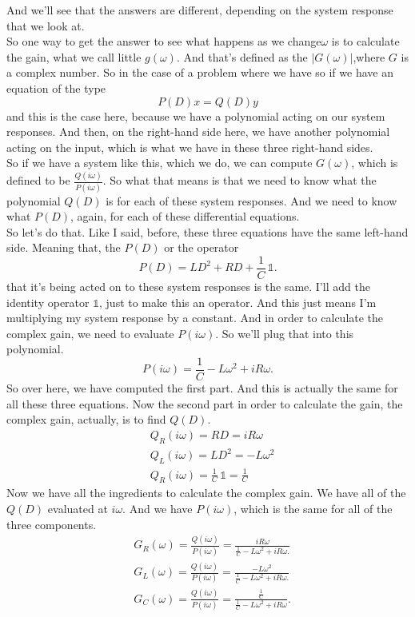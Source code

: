 And we'll see that the answers are different,
depending on the system response that we look at. \\


So one way to get the answer to see
what happens as we change$\omega$ is to calculate the gain, what we call little $g(\omega)$.
And that's defined as the $|G(\omega)|$,where $G$ is a complex number.
So in the case of a problem where we have
so if we have an equation of the type 
\begin{equation*}
  P(D)x = Q(D)y 
\end{equation*}
and this is the case here, because we have a polynomial acting on our system responses.
And then, on the right-hand side here, we have another polynomial acting on the input, which
is what we have in these three right-hand sides.\\
So if we have a system like this, which we do,
we can compute $G(\omega)$, which
is defined to be $\frac{Q(i \omega)}{P(i \omega)}$.
So what that means is that we need
to know what the polynomial $Q(D)$ is for each of these system responses.
And we need to know what $P(D)$, again, for each of these differential equations.\\


So let's do that.
Like I said, before, these three equations
have the same left-hand side.
Meaning that, the $P(D)$ or the operator
\begin{equation*}
  P(D) = LD^2 + RD + \frac{1}{C}\,  \mathds{1}. 
\end{equation*}
that it's being acted on to these system responses is the same.
I'll add the identity operator $\mathds{1}$, just to make this an operator.
And this just means I'm multiplying my system response by a constant.
And in order to calculate the complex gain,
we need to evaluate $P(i \omega)$.
So we'll plug that into this polynomial.
\begin{equation*}
  P(i \omega) = \frac{1}{C} - L \omega ^2 + iR \omega. 
\end{equation*}
So over here, we have computed the first part.
And this is actually the same for all these three equations.
Now the second part in order to calculate the gain,
the complex gain, actually, is to find $Q(D)$.
\begin{align*}
  &Q _R(i \omega) = RD = iR \omega \\
  &Q _L(i \omega) = LD^2 = -L \omega^2 \\
  &Q _R(i \omega) = \frac{1}{C}\, \mathds{1} = \frac{1}{C}
\end{align*}
Now we have all the ingredients to calculate the complex gain.
We have all of the $Q(D)$ evaluated at $i \omega$.
And we have $P(i \omega)$, which is the same for all
of the three components.
\begin{align*}
  &G _R(\omega) = \frac{Q(i \omega)}{P(i \omega)}
    = \frac{iR \omega}{\frac{1}{C} - L \omega ^2 + iR \omega. } \\
  &G _L(\omega) = \frac{Q(i \omega)}{P(i \omega)}
    = \frac{-L \omega ^2}{\frac{1}{C} - L \omega ^2 + iR \omega. } \\
  &G _C(\omega) = \frac{Q(i \omega)}{P(i \omega)}
    = \frac{\frac{1}{C}}{\frac{1}{C} - L \omega ^2 + iR \omega}.    
\end{align*}

